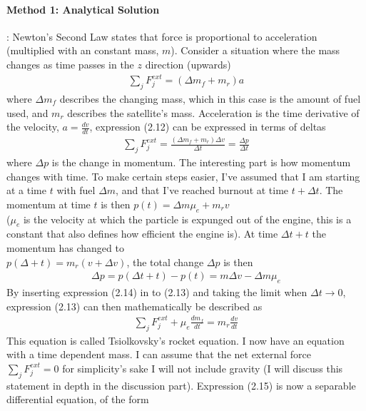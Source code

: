 \documentclass[a4paper,11pt,english]{report}
\begin{document}
\paragraph{Method 1: Analytical Solution}:  Newton's Second Law states that
force is proportional to acceleration (multiplied with an constant mass, \(m\)).
Consider a situation where the mass changes as  time passes in the \(z\) direction (upwards)
\begin{align}
  \sum_{j}F_{j}^{ext} = (\Delta m_{f} + m_{r})a 
\end{align}
where \(\Delta m_{f}\) describes the changing mass, which in this case is the
amount of fuel used, and \(m_{r}\) describes the satellite's mass. Acceleration is the time
derivative of the velocity, \(a = \frac{dv}{dt}\), expression (2.12) can be
expressed in terms of deltas
\begin{align}
  \sum_{j}F_{j}^{ext} = \frac{(\Delta m_{f} + m_{r})\Delta v}{\Delta t} =
  \frac{\Delta p}{\Delta t}
\end{align}
where \(\Delta p\) is the change in momentum. The interesting part is how 
momentum changes with time. To make certain steps easier, I've assumed that I
am starting
at a time \(t\) with fuel \(\Delta m\), and that I've reached burnout at time
\(t + \Delta t\).
The momentum at time \(t\) is then \(p(t) = \Delta m\mu_{e}
+ m_{r}v\)\\ (\(\mu_{e}\) is the velocity at which the particle is expunged out of the
engine, this is a constant that also defines how efficient the engine is).
At time \(\Delta t + t\) the momentum has changed to \\
\(p(\Delta + t) = m_{r}(v+ \Delta v)\), the total change \(\Delta p\) is then
\begin{align}
  \Delta p = p(\Delta t + t)-p(t) = m\Delta v -\Delta m\mu_{e}
\end{align}
By inserting expression (2.14) in to (2.13) and taking the limit when \(\Delta t \to
0\), expression (2.13) can then mathematically be described as
\begin{align}
  \sum_{j}F_{j}^{ext}  + \mu_{e}\frac{dm_{f}}{dt} = m_{r}\frac{dv}{dt}
\end{align}
This equation is called Tsiolkovsky's rocket equation. I now have an equation
with a time dependent mass.  I can assume that the net external force
\(\sum_{j}F_{j}^{ext} = 0\) for simplicity's sake I will not include gravity
(I will discuss this statement in depth in
the discussion part). Expression (2.15) is now a separable differential
equation, of the form
\end{document}
